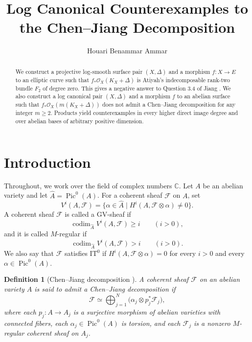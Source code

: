 \documentclass[11pt,letterpaper]{article}
\title{\bfseries Log Canonical Counterexamples to the Chen--Jiang Decomposition}
\author{Houari Benammar Ammar}
\date{}
\theoremstyle{paper}
\newtheorem{definition}[theorem]{Definition}
\newcommand{\OO}{\mathcal O}
\newcommand{\FF}{\mathcal F}
\newcommand{\CC}{\mathbb C}
\DeclareMathOperator{\Pic}{Pic}
\DeclareMathOperator{\codim}{codim}
\begin{document}
\maketitle
\begingroup
\renewcommand{\thefootnote}{}
\endgroup
\begin{abstract}
We construct a projective log-smooth surface pair $(X,\Delta)$ and a morphism $f:X\to E$ to an elliptic curve such that $f_*\OO_X(K_X+\Delta)$ is Atiyah's indecomposable rank-two bundle $F_2$ of degree zero. This gives a negative answer to Question 3.4 of Jiang \cite{Jiang}. We also construct a log canonical pair $(X,\Delta)$ and a morphism $f$ to an abelian surface such that $f_*\OO_X(m(K_X+\Delta))$ does not admit a Chen--Jiang decomposition for any integer $m\ge2$. Products yield counterexamples in every higher direct image degree and over abelian bases of arbitrary positive dimension.
\end{abstract}

\section{Introduction}
Throughout, we work over the field of complex numbers $\CC$. Let $A$ be an abelian variety and let $\widehat A=\Pic^0(A)$. For a coherent sheaf $\FF$ on $A$, set
\[
V^i(A,\FF)=\{\alpha\in\widehat A\mid H^i(A,\FF\otimes\alpha)\ne0\}.
\]
A coherent sheaf $\FF$ is called a GV-sheaf \cite[\S2]{PP} if
\[
\codim_{\widehat A}V^i(A,\FF)\ge i\qquad(i>0),
\]
and it is called $M$-regular \cite[\S2]{PP} if
\[
\codim_{\widehat A}V^i(A,\FF)>i\qquad(i>0).
\]
We also say that $\FF$ satisfies $\mathrm{IT}^0$ if $H^i(A,\FF\otimes\alpha)=0$ for every $i>0$ and every $\alpha\in\Pic^0(A)$.

\begin{definition}[Chen--Jiang decomposition {\cite[Theorem 1.1]{CJ}}]
A coherent sheaf $\FF$ on an abelian variety $A$ is said to admit a Chen--Jiang decomposition if
\[
\FF\simeq\bigoplus_{j=1}^N\bigl(\alpha_j\otimes p_j^*\FF_j\bigr),
\]
where each $p_j:A\to A_j$ is a surjective morphism of abelian varieties with connected fibers, each $\alpha_j\in\Pic^0(A)$ is torsion, and each $\FF_j$ is a nonzero $M$-regular coherent sheaf on $A_j$.
\end{definition}
\end{document}

